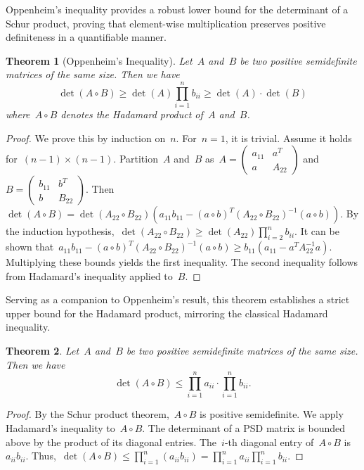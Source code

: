 \documentclass[12pt]{article}
\newtheorem{theorem}{Theorem}[section]
\begin{document}
\noindent Oppenheim's inequality provides a robust lower bound for the determinant of a Schur product, proving that element-wise multiplication preserves positive definiteness in a quantifiable manner.
\begin{theorem}[Oppenheim's Inequality]
Let~$A$ and~$B$ be two positive semidefinite matrices of the same size. Then we have
\[ \det(A \circ B) \ge \det(A) \prod_{i=1}^n b_{ii} \ge \det(A) \cdot \det(B) \]
where~$A \circ B$ denotes the Hadamard product of~$A$ and~$B$.
\end{theorem}
\begin{proof}
We prove this by induction on~$n$. For~$n=1$, it is trivial. Assume it holds for~$(n-1) \times (n-1)$. Partition~$A$ and~$B$ as~$A = \begin{pmatrix} a_{11} & a^T \\ a & A_{22} \end{pmatrix}$ and~$B = \begin{pmatrix} b_{11} & b^T \\ b & B_{22} \end{pmatrix}$. Then~$\det(A \circ B) = \det(A_{22} \circ B_{22}) ( a_{11}b_{11} - (a \circ b)^T (A_{22} \circ B_{22})^{-1} (a \circ b) )$. By the induction hypothesis,~$\det(A_{22} \circ B_{22}) \ge \det(A_{22}) \prod_{i=2}^n b_{ii}$. It can be shown that~$a_{11}b_{11} - (a \circ b)^T (A_{22} \circ B_{22})^{-1} (a \circ b) \ge b_{11}(a_{11} - a^T A_{22}^{-1} a)$. Multiplying these bounds yields the first inequality. The second inequality follows from Hadamard's inequality applied to~$B$.
\end{proof}

\noindent Serving as a companion to Oppenheim's result, this theorem establishes a strict upper bound for the Hadamard product, mirroring the classical Hadamard inequality.
\begin{theorem}
Let~$A$ and~$B$ be two positive semidefinite matrices of the same size. Then we have
\[ \det(A \circ B) \le \prod_{i=1}^n a_{ii} \cdot \prod_{i=1}^n b_{ii}. \]
\end{theorem}
\begin{proof}
By the Schur product theorem,~$A \circ B$ is positive semidefinite. We apply Hadamard's inequality to~$A \circ B$. The determinant of a PSD matrix is bounded above by the product of its diagonal entries. The~$i$-th diagonal entry of~$A \circ B$ is~$a_{ii}b_{ii}$. Thus,~$\det(A \circ B) \le \prod_{i=1}^n (a_{ii}b_{ii}) = \prod_{i=1}^n a_{ii} \prod_{i=1}^n b_{ii}$.
\end{proof}
\end{document}
